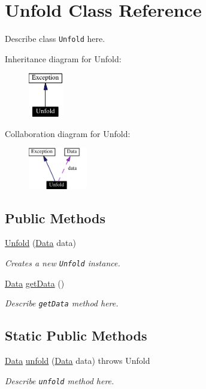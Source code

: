 \hypertarget{classUnfold}{
\section{Unfold  Class Reference}
\label{classUnfold}
}
Describe class {\tt Unfold} here. 


Inheritance diagram for Unfold:\begin{figure}[H]
\begin{center}
\leavevmode
\includegraphics[width=43pt]{classUnfold__inherit__graph}
\end{center}
\end{figure}
Collaboration diagram for Unfold:\begin{figure}[H]
\begin{center}
\leavevmode
\includegraphics[width=73pt]{classUnfold__coll__graph}
\end{center}
\end{figure}
\subsection*{Public Methods}
\begin{CompactItemize}
\item 
\hyperlink{classUnfold_a0}{Unfold} (\hyperlink{interfaceData}{Data} data)
\begin{CompactList}\small\item\em Creates a new {\tt Unfold} instance.\item\end{CompactList}\item 
\hyperlink{interfaceData}{Data} \hyperlink{classUnfold_a1}{get\-Data} ()
\begin{CompactList}\small\item\em Describe {\tt get\-Data} method here.\item\end{CompactList}\end{CompactItemize}
\subsection*{Static Public Methods}
\begin{CompactItemize}
\item 
\hyperlink{interfaceData}{Data} \hyperlink{classUnfold_d0}{unfold} (\hyperlink{interfaceData}{Data} data) throws Unfold
\begin{CompactList}\small\item\em Describe {\tt unfold} method here.\item\end{CompactList}\end{CompactItemize}


